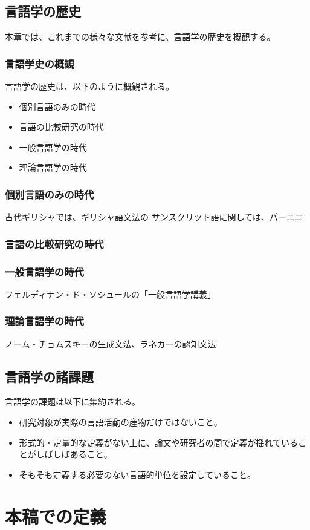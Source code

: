 \documentclass[12pt, oneside]{book}
\begin{document}
\chapter{言語学の歴史}
本章では、これまでの様々な文献を参考に、言語学の歴史を概観する。
\section{言語学史の概観}
言語学の歴史は、以下のように概観される。
\begin{itemize}
    \item 個別言語のみの時代
    \item 言語の比較研究の時代
    \item 一般言語学の時代
    \item 理論言語学の時代
\end{itemize}
\section{個別言語のみの時代}
古代ギリシャでは、ギリシャ語文法の
サンスクリット語に関しては、パーニニ
\section{言語の比較研究の時代}
\section{一般言語学の時代}
フェルディナン・ド・ソシュールの「一般言語学講義」
\section{理論言語学の時代}
ノーム・チョムスキーの生成文法、ラネカーの認知文法
\chapter{言語学の諸課題}
言語学の課題は以下に集約される。
\begin{itemize}
    \item 研究対象が実際の言語活動の産物だけではないこと。
    \item 形式的・定量的な定義がない上に、論文や研究者の間で定義が揺れていることがしばしばあること。
    \item そもそも定義する必要のない言語的単位を設定していること。
\end{itemize}
\part{本稿での定義}
\end{document}
